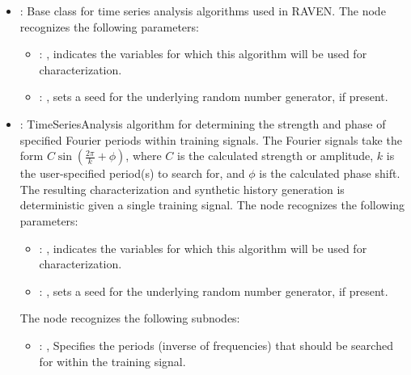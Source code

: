 \begin{itemize}
    \item {}:
      Base class for time series analysis algorithms used in RAVEN.
      The  node recognizes the following parameters:
        \begin{itemize}
          \item {}: , 
            indicates the variables for which this algorithm will be used for characterization.
          \item {}: , 
            sets a seed for the underlying random number generator, if present.
      \end{itemize}

    \item {}:
      TimeSeriesAnalysis algorithm for determining the strength and phase of
      specified Fourier periods within training signals. The Fourier signals take
      the form $C\sin(\frac{2\pi}{k}+\phi)$, where $C$ is the calculated strength
      or amplitude, $k$ is the user-specified period(s) to search for, and $\phi$
      is the calculated phase shift. The resulting characterization and synthetic
      history generation is deterministic given a single training signal.
      The  node recognizes the following parameters:
        \begin{itemize}
          \item {}: , 
            indicates the variables for which this algorithm will be used for characterization.
          \item {}: , 
            sets a seed for the underlying random number generator, if present.
      \end{itemize}

      The  node recognizes the following subnodes:
      \begin{itemize}
        \item {}: , 
          Specifies the periods (inverse of frequencies) that should be searched
          for within the training signal.
      \end{itemize}


\end{itemize}
